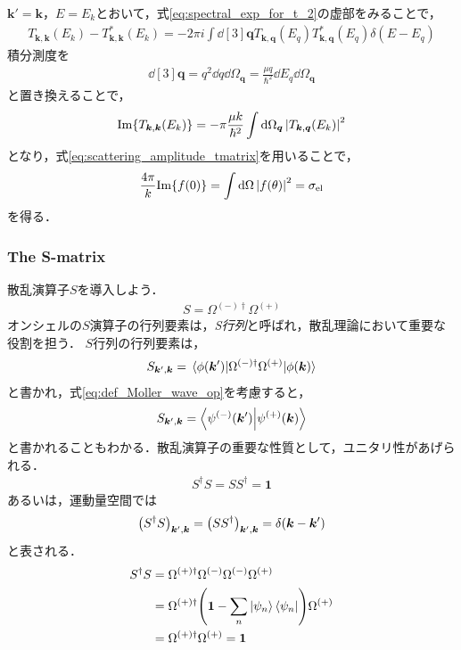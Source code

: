 \documentclass[a4paper,11pt]{ltjsarticle}
\numberwithin{equation}{section}
\begin{document}
$\bm{k}' = \bm{k}$，$E = E_k$とおいて，式\ref{eq:spectral_exp_for_t_2}の虚部をみることで，
\begin{align}\label{eq:imaginary_part_of_T}
  T_{\bm{k}, \bm{k}}(E_k) - T_{\bm{k}, \bm{k}}^*(E_k) = -2\pi i \int \dd[3]{\bm{q}}T_{\bm{k}, \bm{q}}(E_q) T_{\bm{k}, \bm{q}}^*(E_q)\delta(E-E_q)
\end{align}
積分測度を
\begin{align*}
  \dd[3]{\bm{q}} = q^2 \dd{q} \dd{\Omega_{\bm{q}}} = \frac{\mu q}{\hbar^2} \dd{E_q} \dd{\Omega_{\bm{q}}}
\end{align*}
と置き換えることで，
\begin{align}\label{eq:imaginary_part_of_t_2}
  \mathrm{Im} \qty{T_{\bm{k}, \bm{k}}(E_k)} = - \pi \frac{\mu k}{\hbar^2} \int \dd{\Omega_{\bm{q}}} \abs{T_{\bm{k},\bm{q}}(E_k)}^2
\end{align}
となり，式\ref{eq:scattering_amplitude_tmatrix}を用いることで，
\begin{align}\label{eq:optical_theorem}
  \frac{4\pi}{k}\mathrm{Im}\qty{f(0)} = \int \dd{\Omega} \abs{f(\theta)}^2 = \sigma_\text{el}
\end{align}
を得る．
\subsubsection{The S-matrix}
散乱演算子$S$を導入しよう．
\begin{align}\label{eq:def_of_S_operator}
  S = \Omega^{(-)\dagger} \Omega^{(+)}
\end{align}
オンシェルの$S$演算子の行列要素は，\emph{S行列}と呼ばれ，散乱理論において重要な役割を担う．
$S$行列の行列要素は，
\begin{align}\label{eq:s_matrix_element}
  S_{\bm{k}', \bm{k}} = \mel{\phi(\bm{k}')}{\Omega^{(-)\dagger} \Omega^{(+)}}{\phi(\bm{k})}
\end{align}
と書かれ，式\ref{eq:def_Moller_wave_op}を考慮すると，
\begin{align}\label{eq:s_matrix_element_2}
  S_{\bm{k}', \bm{k} } = \braket{\psi^{(-)}(\bm{k}')}{\psi^{(+)}(\bm{k})}
\end{align}
と書かれることもわかる．散乱演算子の重要な性質として，ユニタリ性があげられる．
\begin{align}\label{eq:unitarity_of_S}
  S^{\dagger} S = S S^{\dagger} = \bm{1}
\end{align}
あるいは，運動量空間では
\begin{align}\label{eq:unitarity_of_s_in_momentum}
  \qty(S^{\dagger} S)_{\bm{k}', \bm{k}} = \qty(S S^{\dagger})_{\bm{k}', \bm{k}} = \delta(\bm{k} -\bm{k}')
\end{align}
と表される． 
\begin{align*}
  S^{\dagger} S 
  &= \Omega^{(+)\dagger} \Omega^{(-)} \Omega^{(-)} \Omega^{(+)} \\
  &= \Omega^{(+)\dagger} \qty(\bm{1} - \sum_n \ket{\psi_n}\bra{\psi_n}) \Omega^{(+)} \\
  &= \Omega^{(+)\dagger} \Omega^{(+)} = \bm{1}
\end{align*}
\end{document}
